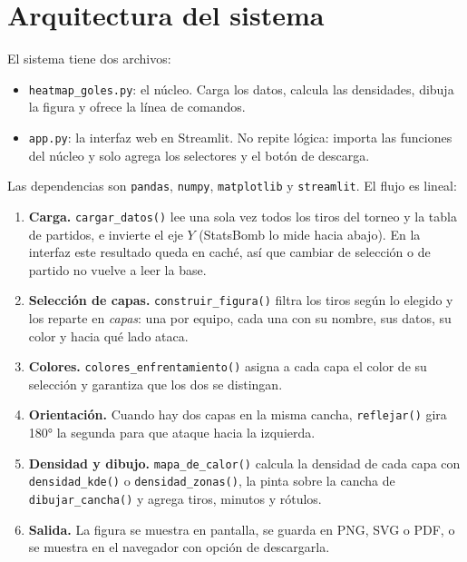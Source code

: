\documentclass[11pt,a4paper]{article}
\begin{document}
\section{Arquitectura del sistema}

El sistema tiene dos archivos:

\begin{itemize}
  \item \texttt{heatmap\_goles.py}: el núcleo. Carga los datos, calcula las densidades,
    dibuja la figura y ofrece la línea de comandos.
  \item \texttt{app.py}: la interfaz web en Streamlit. No repite lógica: importa las
    funciones del núcleo y solo agrega los selectores y el botón de descarga.
\end{itemize}

Las dependencias son \texttt{pandas}, \texttt{numpy}, \texttt{matplotlib} y
\texttt{streamlit}. El flujo es lineal:

\begin{enumerate}
  \item \textbf{Carga.} \texttt{cargar\_datos()} lee una sola vez todos los tiros del torneo
    y la tabla de partidos, e invierte el eje $Y$ (StatsBomb lo mide hacia abajo). En la
    interfaz este resultado queda en caché, así que cambiar de selección o de partido no
    vuelve a leer la base.
  \item \textbf{Selección de capas.} \texttt{construir\_figura()} filtra los tiros según
    lo elegido y los reparte en \emph{capas}: una por equipo, cada una con su nombre, sus
    datos, su color y hacia qué lado ataca.
  \item \textbf{Colores.} \texttt{colores\_enfrentamiento()} asigna a cada capa el color de
    su selección y garantiza que los dos se distingan.
  \item \textbf{Orientación.} Cuando hay dos capas en la misma cancha, \texttt{reflejar()}
    gira 180° la segunda para que ataque hacia la izquierda.
  \item \textbf{Densidad y dibujo.} \texttt{mapa\_de\_calor()} calcula la densidad de cada
    capa con \texttt{densidad\_kde()} o \texttt{densidad\_zonas()}, la pinta sobre la cancha
    de \texttt{dibujar\_cancha()} y agrega tiros, minutos y rótulos.
  \item \textbf{Salida.} La figura se muestra en pantalla, se guarda en PNG, SVG o PDF, o se
    muestra en el navegador con opción de descargarla.
\end{enumerate}
\end{document}
